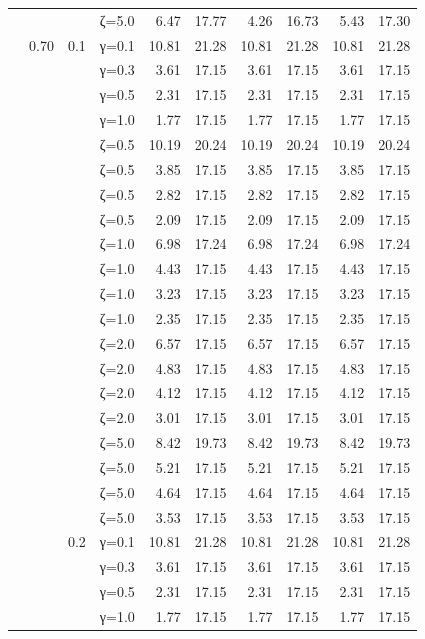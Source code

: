 \begin{table}[htbp]
\begin{tabular}{ll r l  rr  rr  rr}
  &  &  & ζ=5.0 & 6.47 & 17.77 & 4.26 & 16.73 & 5.43 & 17.30 \\
  & 0.70 & 0.1 & γ=0.1 & 10.81 & 21.28 & 10.81 & 21.28 & 10.81 & 21.28 \\
  &  &  & γ=0.3 & 3.61 & 17.15 & 3.61 & 17.15 & 3.61 & 17.15 \\
  &  &  & γ=0.5 & 2.31 & 17.15 & 2.31 & 17.15 & 2.31 & 17.15 \\
  &  &  & γ=1.0 & 1.77 & 17.15 & 1.77 & 17.15 & 1.77 & 17.15 \\
  &  &  & ζ=0.5 & 10.19 & 20.24 & 10.19 & 20.24 & 10.19 & 20.24 \\
  &  &  & ζ=0.5 & 3.85 & 17.15 & 3.85 & 17.15 & 3.85 & 17.15 \\
  &  &  & ζ=0.5 & 2.82 & 17.15 & 2.82 & 17.15 & 2.82 & 17.15 \\
  &  &  & ζ=0.5 & 2.09 & 17.15 & 2.09 & 17.15 & 2.09 & 17.15 \\
  &  &  & ζ=1.0 & 6.98 & 17.24 & 6.98 & 17.24 & 6.98 & 17.24 \\
  &  &  & ζ=1.0 & 4.43 & 17.15 & 4.43 & 17.15 & 4.43 & 17.15 \\
  &  &  & ζ=1.0 & 3.23 & 17.15 & 3.23 & 17.15 & 3.23 & 17.15 \\
  &  &  & ζ=1.0 & 2.35 & 17.15 & 2.35 & 17.15 & 2.35 & 17.15 \\
  &  &  & ζ=2.0 & 6.57 & 17.15 & 6.57 & 17.15 & 6.57 & 17.15 \\
  &  &  & ζ=2.0 & 4.83 & 17.15 & 4.83 & 17.15 & 4.83 & 17.15 \\
  &  &  & ζ=2.0 & 4.12 & 17.15 & 4.12 & 17.15 & 4.12 & 17.15 \\
  &  &  & ζ=2.0 & 3.01 & 17.15 & 3.01 & 17.15 & 3.01 & 17.15 \\
  &  &  & ζ=5.0 & 8.42 & 19.73 & 8.42 & 19.73 & 8.42 & 19.73 \\
  &  &  & ζ=5.0 & 5.21 & 17.15 & 5.21 & 17.15 & 5.21 & 17.15 \\
  &  &  & ζ=5.0 & 4.64 & 17.15 & 4.64 & 17.15 & 4.64 & 17.15 \\
  &  &  & ζ=5.0 & 3.53 & 17.15 & 3.53 & 17.15 & 3.53 & 17.15 \\
  &  & 0.2 & γ=0.1 & 10.81 & 21.28 & 10.81 & 21.28 & 10.81 & 21.28 \\
  &  &  & γ=0.3 & 3.61 & 17.15 & 3.61 & 17.15 & 3.61 & 17.15 \\
  &  &  & γ=0.5 & 2.31 & 17.15 & 2.31 & 17.15 & 2.31 & 17.15 \\
  &  &  & γ=1.0 & 1.77 & 17.15 & 1.77 & 17.15 & 1.77 & 17.15 \\

\end{tabular}
\end{table}
